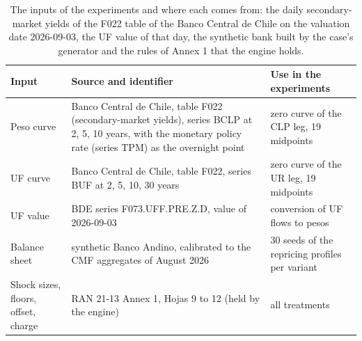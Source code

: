 \begin{table}[htbp]
\centering
\footnotesize
\setlength{\tabcolsep}{3.5pt}
\caption{The inputs of the experiments and where each comes from: the daily secondary-market yields of the F022 table of the Banco Central de Chile on the valuation date 2026-09-03, the UF value of that day, the synthetic bank built by the case's generator and the rules of Annex 1 that the engine holds.}
\label{tab:data}
\begin{tabular}{p{2.4cm}p{6.6cm}p{5.4cm}}
\toprule
Input & Source and identifier & Use in the experiments \\
\midrule
Peso curve & Banco Central de Chile, table F022 (secondary-market yields), series BCLP at 2, 5, 10 years, with the monetary policy rate (series TPM) as the overnight point & zero curve of the CLP leg, 19 midpoints \\
UF curve & Banco Central de Chile, table F022, series BUF at 2, 5, 10, 30 years & zero curve of the UR leg, 19 midpoints \\
UF value & BDE series F073.UFF.PRE.Z.D, value of 2026-09-03 & conversion of UF flows to pesos \\
Balance sheet & synthetic Banco Andino, calibrated to the CMF aggregates of August 2026 & 30 seeds of the repricing profiles per variant \\
Shock sizes, floors, offset, charge & RAN 21-13 Annex 1, Hojas 9 to 12 (held by the engine) & all treatments \\
\bottomrule
\end{tabular}
\end{table}
